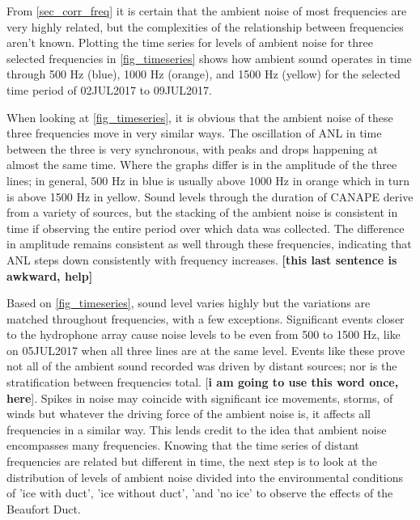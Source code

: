From \autoref{sec_corr_freq} it is certain that the ambient noise of most frequencies are very highly related, but the complexities of the relationship between frequencies aren't known. Plotting the time series for levels of ambient noise for three selected frequencies in \autoref{fig_timeseries} shows how ambient sound operates in time through 500 Hz (blue), 1000 Hz (orange), and 1500 Hz (yellow) for the selected time period of 02JUL2017 to 09JUL2017. %

When looking at \autoref{fig_timeseries}, it is obvious that the ambient noise of these three frequencies move in very similar ways. The oscillation of ANL in time between the three is very synchronous, with peaks and drops happening at almost the same time. Where the graphs differ is in the amplitude of the three lines; in general, 500 Hz in blue is usually above 1000 Hz in orange which in turn is above 1500 Hz in yellow. Sound levels through the duration of CANAPE derive from a variety of sources, but the stacking of the ambient noise is consistent in time if observing the entire period over which data was collected. The difference in amplitude remains consistent as well through these frequencies, indicating that ANL steps down consistently with frequency increases. \textbf{[this last sentence is awkward, help] }

Based on \autoref{fig_timeseries}, sound level varies highly but the variations are matched throughout frequencies, with a few exceptions. Significant events closer to the hydrophone array cause noise levels to be even from 500 to 1500 Hz, like on 05JUL2017 when all three lines are at the same level. Events like these prove not all of the ambient sound recorded was driven by distant sources; nor is the stratification between frequencies total. [\textbf{i am going to use this word once, here}]. Spikes in noise may coincide with significant ice movements, storms, of winds but whatever the driving force of the ambient noise is, it affects all frequencies in a similar way. This lends credit to the idea that ambient noise encompasses many frequencies. Knowing that the time series of distant frequencies are related but different in time, the next step is to look at the distribution of levels of ambient noise divided into the environmental conditions of 'ice with duct', 'ice without duct', 'and 'no ice' to observe the effects of the Beaufort Duct.


